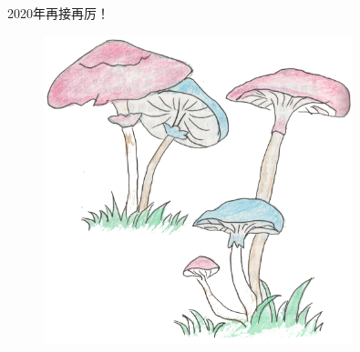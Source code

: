 2020年再接再厉！

\begin{figure}[htb]
    \centering
    \includegraphics[width=0.8\textwidth]{figure/05.png}
\end{figure}
